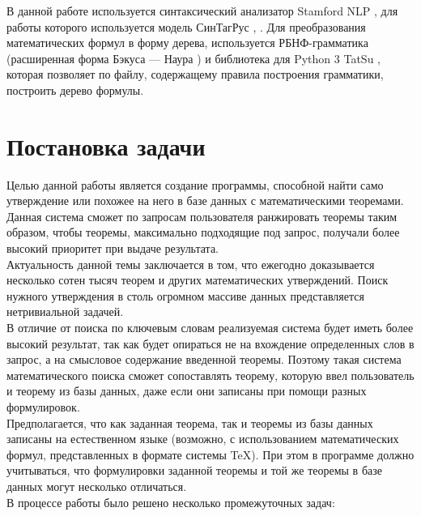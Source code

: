 \documentclass[12pt]{article}
\begin{document}
В данной работе используется синтаксический анализатор Stamford NLP \cite{author14}, для работы которого используется модель СинТагРус \cite{author16}, \cite{author17}. Для преобразования математических формул в форму дерева, используется РБНФ-грамматика (расширенная форма Бэкуса — Наура \cite{author13}) и библиотека для Python 3 TatSu \cite{author15}, которая позволяет по файлу, содержащему правила построения грамматики, построить дерево формулы.

\newpage
\section*{Постановка задачи}

Целью данной работы является создание программы, способной найти само утверждение или похожее на него в базе данных с математическими теоремами.\\

Данная система сможет по запросам пользователя ранжировать теоремы таким образом, чтобы теоремы, максимально подходящие под запрос, получали более высокий приоритет при выдаче результата. \\

Актуальность данной темы заключается в том, что ежегодно доказывается несколько сотен тысяч теорем и других математических утверждений. Поиск нужного утверждения в столь огромном массиве данных представляется нетривиальной задачей.\\

В отличие от поиска по ключевым словам реализуемая система будет иметь более высокий результат, так как будет опираться не на вхождение определенных слов в запрос, а на смысловое содержание введенной теоремы. Поэтому такая система математического поиска сможет сопоставлять теорему, которую ввел пользователь и теорему из базы данных, даже если они записаны при помощи разных формулировок.  \\

Предполагается, что как заданная теорема, так и теоремы из базы данных записаны на естественном языке (возможно, с использованием математических формул, представленных в формате системы TeX). При этом в программе должно
учитываться, что формулировки заданной теоремы и той же теоремы в базе данных могут несколько отличаться.  \\

В процессе работы  было решено несколько промежуточных задач: \\
\end{document}
